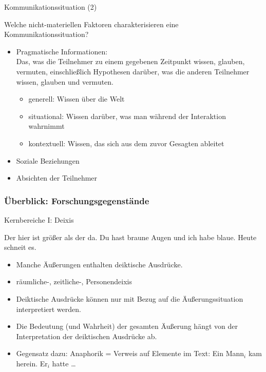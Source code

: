 \begin{frame}{Kommunikationssituation (2)}

Welche nicht-materiellen Faktoren charakterisieren eine Kommunikationssituation?

\begin{itemize}
\item \alert{Pragmatische Informationen}:\\
  Das, was die Teilnehmer zu einem gegebenen Zeitpunkt wissen, glauben, vermuten, einschließlich Hypothesen darüber, was die anderen Teilnehmer wissen, glauben und vermuten.\pause
  \begin{itemize}
    \item \alert{generell}: Wissen über die Welt
    \item \alert{situational}: Wissen darüber, was man während der Interaktion wahrnimmt
    \item \alert{kontextuell}: Wissen, das sich aus dem zuvor Gesagten ableitet
  \end{itemize}\pause
\item \alert{Soziale Beziehungen}\pause
\item \alert{Absichten der Teilnehmer}

\end{itemize}


\end{frame}





\subsubsection{Überblick: Forschungsgegenstände}


\begin{frame}{Kernbereiche I: Deixis}

\begin{exe}
\ex  Der \alert{hier} ist größer als der \alert{da}.
\ex  \alert{Du} hast braune Augen und \alert{ich} habe blaue.
\ex  \alert{Heute} schneit es.
\end{exe}

\pause

\begin{itemize}
\item Manche Äußerungen enthalten deiktische Ausdrücke.\pause
\item räumliche-, zeitliche-, Personendeixis\pause
\item Deiktische Ausdrücke können nur mit Bezug auf die Äußerungssituation interpretiert werden.\pause
\item Die Bedeutung (und Wahrheit) der gesamten Äußerung hängt von der Interpretation der deiktischen Ausdrücke ab.

\bigskip

\item Gegensatz dazu: Anaphorik = Verweis auf Elemente im Text:
\ea
Ein Mann$_i$ kam herein. Er$_i$ hatte \ldots
\z

\end{itemize}


\end{frame}



